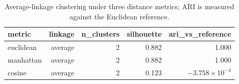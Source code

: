 \begin{table}[htbp]
\centering
\begin{tabular}{lrrrr}
\toprule
metric & linkage & n\_clusters & silhouette & ari\_vs\_reference \\
\midrule
euclidean & average & 2 & 0.882 & 1.000 \\
manhattan & average & 2 & 0.882 & 1.000 \\
cosine & average & 2 & 0.123 & $-3.758\times 10^{-4}$ \\
\bottomrule
\end{tabular}
\caption{Average-linkage clustering under three distance metrics; ARI is measured against the Euclidean reference.}
\label{tab:ablation}
\end{table}
